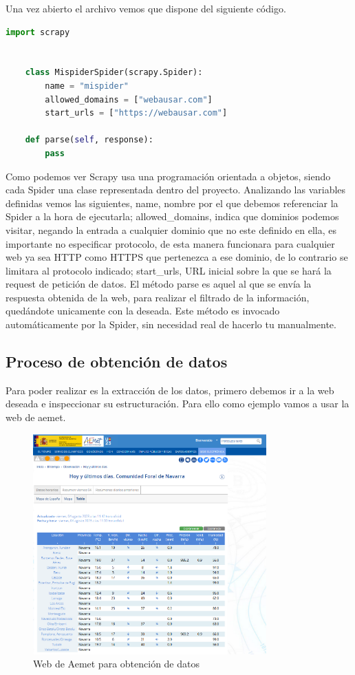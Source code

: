 Una vez abierto el archivo vemos que dispone del siguiente código.

\begin{lstlisting}[language=Python]
	import scrapy
	
	
	class MispiderSpider(scrapy.Spider):
		name = "mispider"
		allowed_domains = ["webausar.com"]
		start_urls = ["https://webausar.com"]
	
	def parse(self, response):
		pass
\end{lstlisting}

Como podemos ver Scrapy usa una programación orientada a objetos, siendo cada Spider una clase representada dentro del proyecto.\newline
Analizando las variables definidas vemos las siguientes, name, nombre por el que debemos referenciar la Spider a la hora de ejecutarla; allowed\_domains, indica que dominios podemos visitar, negando la entrada a cualquier dominio que no este definido en ella, es importante no especificar protocolo, de esta manera funcionara para cualquier web ya sea HTTP como HTTPS que pertenezca a ese dominio, de lo contrario se limitara al protocolo indicado; start\_urls, URL inicial sobre la que se hará la request de petición de datos.\newline
El método parse es aquel al que se envía la respuesta obtenida de la web, para realizar el filtrado de la información, quedándote unicamente con la deseada. Este método es invocado automáticamente por la Spider, sin necesidad real de hacerlo tu manualmente.

\subsection{Proceso de obtención de datos}
Para poder realizar es la extracción de los datos, primero debemos ir a la web deseada e inspeccionar su estructuración. Para ello como ejemplo vamos a usar la web de aemet.\newline

\begin{figure} [H]
	\centering
	\includegraphics[width=0.8\textwidth]{fig/code_aemet.png}
	\caption[URL de inicio para obtener los códigos de las estaciones de Aemet]{Web de Aemet para obtención de datos}
	\label{fig:ej13}
\end{figure}

